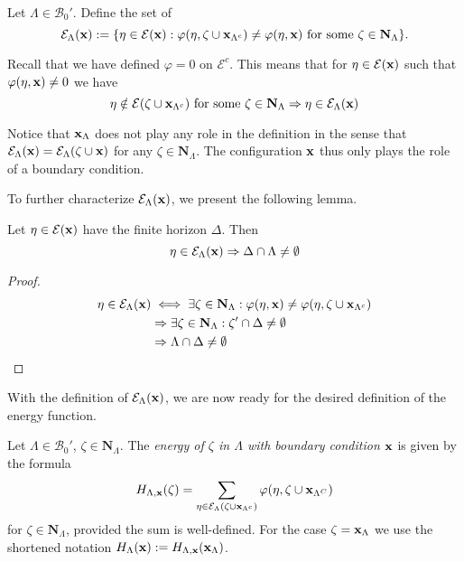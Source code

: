 \begin{definition}\label{def:Eset} Let $\Lambda \in \mathcal B_0'$. Define the set of 
	$$\mathcal E_\Lambda({\mathbf{x}}) := \{ \eta \in \mathcal E({\mathbf{x}}): \varphi(\eta,\zeta \cup {\mathbf{x}}_{\Lambda^c}) \neq \varphi(\eta,{\mathbf{x}}) \text{ for some } \zeta \in \mathbf N_\Lambda \}.$$
\end{definition}

Recall that we have defined $\varphi=0$ on $\mathcal E^c$. This means that for $\eta \in \mathcal E({\mathbf{x}})$ such that $\varphi(\eta,{\mathbf{x}})\neq 0$ we have
$$\eta \notin \mathcal E(\zeta \cup {\mathbf{x}}_{\Lambda^c})\text{ for some }\zeta \in \mathbf N_{\Lambda} \Rightarrow \eta \in \mathcal E_{\Lambda}({\mathbf{x}})$$ 

Notice that ${\mathbf{x}}_\Lambda$ does not play any role in the definition in the sense that $\mathcal E_\Lambda({\mathbf{x}})=\mathcal E_\Lambda(\zeta \cup {\mathbf{x}})$ for any $\zeta \in \mathbf N_\Lambda$. The configuration ${\mathbf{x}}$ thus only plays the role of a boundary condition.

To further characterize $\mathcal E_\Lambda({\mathbf{x}})$, we present the following lemma.
\begin{lemma}\label{lemma:horizEset}Let $\eta \in \mathcal E({\mathbf{x}})$ have the finite horizon $\Delta$. Then
	$$\eta \in \mathcal E_\Lambda({\mathbf{x}}) \Rightarrow \Delta \cap \Lambda \neq \emptyset$$
\end{lemma}
\begin{proof}
	\begin{align*}
		\eta \in \mathcal E_\Lambda({\mathbf{x}}) & \iff \exists \zeta \in \mathbf N_\Lambda: \varphi(\eta,{\mathbf{x}}) \neq \varphi(\eta,\zeta \cup {\mathbf{x}}_{\Lambda^c}) \\
			& \Rightarrow \exists \zeta \in \mathbf N_\Lambda: \zeta' \cap \Delta \neq \emptyset \\
			& \Rightarrow \Lambda \cap \Delta \neq \emptyset
	\end{align*}
\end{proof}


With the definition of $\mathcal E_\Lambda({\mathbf{x}})$, we are now ready for the desired definition of the energy function.

\begin{definition}\label{def:energy}
	Let $\Lambda \in \mathcal B_0'$, $\zeta \in \mathbf N_\Lambda$. The \textit{energy of $\zeta$ in $\Lambda$ with boundary condition ${\mathbf{x}}$} is given by the formula
$$H_{\Lambda,{\mathbf{x}}}(\zeta) = \sum_{\eta \in \mathcal E_\Lambda(\zeta \cup {\mathbf{x}}_{\Lambda^c})} \varphi(\eta, \zeta \cup {\mathbf{x}}_{\Lambda^C})$$
for $\zeta \in \mathbf N_{\Lambda}$, provided the sum is well-defined. \newline
For the case $\zeta = {\mathbf{x}}_\Lambda$ we use the shortened notation $H_\Lambda({\mathbf{x}}):=H_{\Lambda,{\mathbf{x}}}({\mathbf{x}}_\Lambda)$.
\end{definition}

